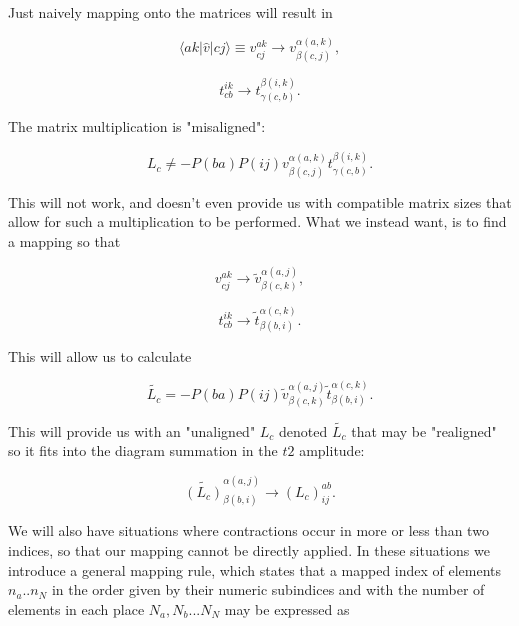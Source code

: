 Just naively mapping onto the matrices will result in

\begin{equation}
 \langle ak \vert \hat{v}\vert cj \rangle \equiv v^{ak}_{cj}  \rightarrow v^{\alpha(a,k)}_{\beta(c,j)},
\end{equation}

\begin{equation}
t^{ik}_{cb}  \rightarrow t^{\beta(i,k)}_{\gamma(c,b)}.
\end{equation}

The matrix multiplication is "misaligned":

\begin{equation}
L_c  \neq -P(ba)P(ij) v^{\alpha(a,k)}_{\beta(c,j)} t^{\beta(i,k)}_{\gamma(c,b)}.
\end{equation}

This will not work, and doesn't even provide us with compatible matrix sizes that allow for such a multiplication to be performed. What we instead want, is to find a mapping so that

\begin{equation}
 v^{ak}_{cj}  \rightarrow \tilde{v}^{\alpha(a,j)}_{\beta(c,k)},
\end{equation}

\begin{equation}
t^{ik}_{cb}  \rightarrow  \tilde{t}^{\alpha(c,k)}_{\beta(b,i)}.
\end{equation}

This will allow us to calculate

\begin{equation}
\tilde{L_c}  = -P(ba)P(ij) \tilde{v}^{\alpha(a,j)}_{\beta(c,k)} \tilde{t}^{\alpha(c,k)}_{\beta(b,i)}.
\end{equation}

This will provide us with an "unaligned" $L_c$ denoted $\tilde{L_c}$ that may be "realigned" so it fits into the diagram summation in the $t2$ amplitude:

\begin{equation}
\tilde{(L_c)}^{\alpha(a,j)}_{\beta(b,i)} \rightarrow {(L_c)}^{ab}_{ij}.
\end{equation}

We will also have situations where contractions occur in more or less than two indices, so that our mapping cannot be directly applied. In these situations we introduce a general mapping rule, which states that a mapped index of elements $n_a .. n_N$ in the order given by their numeric subindices and with the number of elements in each place $N_a, N_b ... N_N$ may be expressed as

